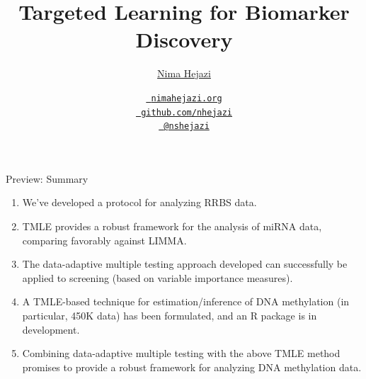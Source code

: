 \documentclass[12pt,t,handout]{beamer}
\title{Targeted Learning for Biomarker Discovery}
\author{\href{http://nimahejazi.org}{Nima Hejazi}}
\institute{Division of Biostatistics \\
           University of California, Berkeley \\
           \url{https://www.stat.berkeley.edu/~nhejazi}
          }
\date{
  \href{http://nimahejazi.org}
      {\tt \scriptsize \color{foreground} nimahejazi.org}
  \\[-4pt]
  \href{https://github.com/nhejazi}
      {\tt \scriptsize \color{foreground} github.com/nhejazi}
  \\[-4pt]
  \href{https://twitter.com/nshejazi}
      {\tt \scriptsize \color{foreground} @nshejazi}
}
\begin{document}
{
}


\begin{frame}[c]{Preview: Summary}

  \begin{enumerate}
  	\itemsep12pt
  	\item We've developed a protocol for analyzing RRBS data.
  	\item TMLE provides a robust framework for the analysis of
          miRNA data, comparing favorably against LIMMA.
  	\item The data-adaptive multiple testing approach developed
          can successfully be applied to screening (based on
          variable importance measures).
  	\item A TMLE-based technique for estimation/inference of DNA
          methylation (in particular, 450K data) has been
          formulated, and an R package is in development.
  	\item Combining data-adaptive multiple testing with the above
    	  TMLE method promises to provide a robust framework for
          analyzing DNA methylation data.
  \end{enumerate}


\end{frame}
\end{document}

